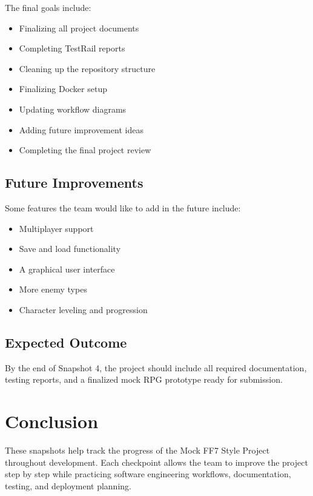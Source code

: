 \documentclass{article}
\begin{document}
The final goals include:

\begin{itemize}
\item Finalizing all project documents
\item Completing TestRail reports
\item Cleaning up the repository structure
\item Finalizing Docker setup
\item Updating workflow diagrams
\item Adding future improvement ideas
\item Completing the final project review
\end{itemize}

\subsection{Future Improvements}

Some features the team would like to add in the future include:

\begin{itemize}
\item Multiplayer support
\item Save and load functionality
\item A graphical user interface
\item More enemy types
\item Character leveling and progression
\end{itemize}

\subsection{Expected Outcome}

By the end of Snapshot 4, the project should include
all required documentation, testing reports, and a finalized
mock RPG prototype ready for submission.

\section{Conclusion}

These snapshots help track the progress of the Mock FF7 Style Project
throughout development. Each checkpoint allows the team to improve
the project step by step while practicing software engineering workflows,
documentation, testing, and deployment planning.
\end{document}
